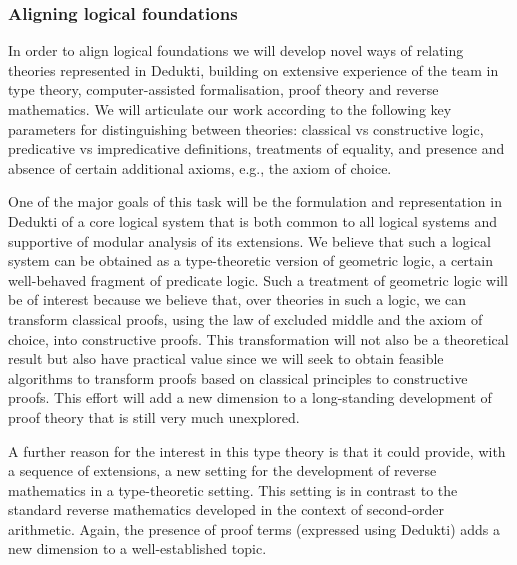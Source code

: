 \newcommand{\parag}[1]{\medskip \noindent {\bf #1}} 

\subsubsection*{Aligning logical foundations}

In order to align logical foundations we will develop novel ways of
relating theories represented in Dedukti, building on extensive
experience of the team in type theory, computer-assisted
formalisation, proof theory and reverse mathematics. We will
articulate our work according to the following key parameters for
distinguishing between theories: classical vs constructive logic,
predicative vs impredicative definitions, treatments of equality, and
presence and absence of certain additional axioms, e.g., the axiom of
choice.

One of the major goals of this task will be the formulation and
representation in Dedukti of a core logical system that is both common
to all logical systems and supportive of modular analysis of its
extensions. We believe that such a logical system can be obtained as a
type-theoretic version of geometric logic, a certain well-behaved
fragment of predicate logic.  Such a treatment of geometric logic
will be of interest because we
believe that, over theories in such a logic, we can transform
classical proofs, using the law of excluded middle and the axiom of
choice, into constructive proofs.  This transformation will not also be
a theoretical result but also have practical value since we 
will seek to obtain feasible algorithms to
transform proofs based on classical principles to constructive proofs.
This effort will add a new dimension to a long-standing development of
proof theory that is still very much unexplored.

A further reason for the interest in this type theory is that it could
provide, with a sequence of extensions, a new setting for the
development of reverse mathematics in a type-theoretic setting. This
setting is in contrast to the standard reverse mathematics developed
in the context of second-order arithmetic. Again, the presence of
proof terms (expressed using Dedukti) adds a new dimension to a
well-established topic.

